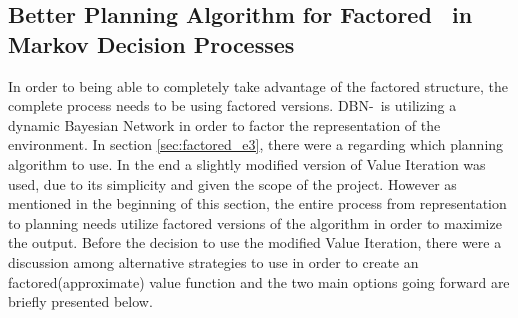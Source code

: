 \subsection{Better Planning Algorithm for Factored \etre\ in Markov Decision Processes }
\label{sec:better_planing_algos}

In order to being able to completely take advantage of the factored structure, the complete process needs to be using factored versions. DBN-\etre\ is utilizing a dynamic Bayesian Network in order to factor the representation of the environment. In section \ref{sec:factored_e3}, there were a  regarding which planning algorithm to use. In the end a slightly modified version of Value Iteration was used, due to its simplicity and given the scope of the project. 
However as mentioned in the beginning of this section, the entire process from representation to planning needs utilize factored versions of the algorithm in order to maximize the output. Before the decision to use the modified Value Iteration, there were a discussion among alternative strategies to use in order to create an factored(approximate) value function and the two main options going forward are briefly presented below.




